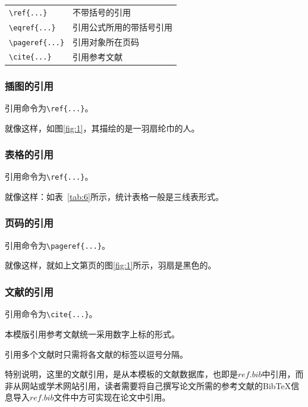 \begin{tabular}{l l}
  \verb|\ref{...}|   & 不带括号的引用 \\
  \verb|\eqref{...}|  & 引用公式所用的带括号引用 \\
  \verb|\pageref{...}| & 引用对象所在页码 \\
  \verb|\cite{...}| & 引用参考文献 
\end{tabular}

\subsubsection{插图的引用}

引用命令为\verb|\ref{...}|。

就像这样，如图\ref{fig:1}，其描绘的是一羽扇纶巾的人。\par 

\subsubsection{表格的引用}

引用命令为\verb|\ref{...}|。

就像这样：如表~\ref{tab:6}所示，统计表格一般是三线表形式。

\subsubsection{页码的引用}

引用命令为\verb|\pageref{...}|。

就像这样，就如上文第\pageref{fig:1}页的图\ref{fig:1}所示，羽扇是黑色的。

\subsubsection{文献的引用}

引用命令为\verb|\cite{...}|。

本模版引用参考文献统一采用数字上标的形式\cite{r1}。

引用多个文献时只需将各文献的标签以逗号分隔\cite{r1,r2,r3,r4,r5}。

特别说明，这里的文献引用，是从本模板的文献数据库，也即是$ref.bib$中引用，而非从网站或学术网站引用，读者需要将自己撰写论文所需的参考文献的BibTeX信息导入$ref.bib$文件中方可实现在论文中引用。